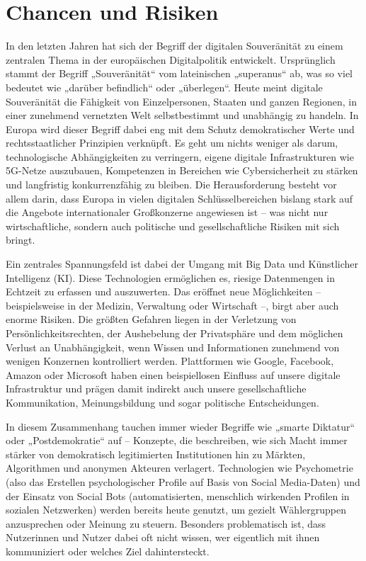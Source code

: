 \documentclass[utf8,biblatex]{bremerhaven_lni}
\begin{document}
\section{Chancen und Risiken}

In den letzten Jahren hat sich der Begriff der digitalen Souveränität zu einem zentralen Thema in der europäischen Digitalpolitik entwickelt. Ursprünglich stammt der Begriff „Souveränität“ vom lateinischen „superanus“ ab, was so viel bedeutet wie „darüber befindlich“ oder „überlegen“. Heute meint digitale Souveränität die Fähigkeit von Einzelpersonen, Staaten und ganzen Regionen, in einer zunehmend vernetzten Welt selbstbestimmt und unabhängig zu handeln. In Europa wird dieser Begriff dabei eng mit dem Schutz demokratischer Werte und rechtsstaatlicher Prinzipien verknüpft. Es geht um nichts weniger als darum, technologische Abhängigkeiten zu verringern, eigene digitale Infrastrukturen wie 5G-Netze auszubauen, Kompetenzen in Bereichen wie Cybersicherheit zu stärken und langfristig konkurrenzfähig zu bleiben. Die Herausforderung besteht vor allem darin, dass Europa in vielen digitalen Schlüsselbereichen bislang stark auf die Angebote internationaler Großkonzerne angewiesen ist – was nicht nur wirtschaftliche, sondern auch politische und gesellschaftliche Risiken mit sich bringt.

Ein zentrales Spannungsfeld ist dabei der Umgang mit Big Data und Künstlicher Intelligenz (KI). Diese Technologien ermöglichen es, riesige Datenmengen in Echtzeit zu erfassen und auszuwerten. Das eröffnet neue Möglichkeiten – beispielsweise in der Medizin, Verwaltung oder Wirtschaft –, birgt aber auch enorme Risiken. Die größten Gefahren liegen in der Verletzung von Persönlichkeitsrechten, der Aushebelung der Privatsphäre und dem möglichen Verlust an Unabhängigkeit, wenn Wissen und Informationen zunehmend von wenigen Konzernen kontrolliert werden. Plattformen wie Google, Facebook, Amazon oder Microsoft haben einen beispiellosen Einfluss auf unsere digitale Infrastruktur und prägen damit indirekt auch unsere gesellschaftliche Kommunikation, Meinungsbildung und sogar politische Entscheidungen.

In diesem Zusammenhang tauchen immer wieder Begriffe wie „smarte Diktatur“ oder „Postdemokratie“ auf – Konzepte, die beschreiben, wie sich Macht immer stärker von demokratisch legitimierten Institutionen hin zu Märkten, Algorithmen und anonymen Akteuren verlagert. Technologien wie Psychometrie (also das Erstellen psychologischer Profile auf Basis von Social Media-Daten) und der Einsatz von Social Bots (automatisierten, menschlich wirkenden Profilen in sozialen Netzwerken) werden bereits heute genutzt, um gezielt Wählergruppen anzusprechen oder Meinung zu steuern. Besonders problematisch ist, dass Nutzerinnen und Nutzer dabei oft nicht wissen, wer eigentlich mit ihnen kommuniziert oder welches Ziel dahintersteckt.
\end{document}

